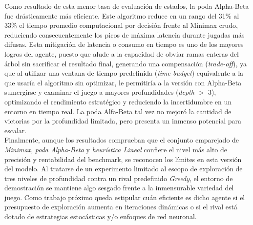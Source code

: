 \documentclass[journal,onecolumn]{IEEEtran}
\begin{document}
Como resultado de esta menor tasa de evaluación de estados, la poda Alpha-Beta fue drásticamente más eficiente. Este algoritmo reduce en un rango del 31\% al 33\% el tiempo promedio computacional por decisión frente al Minimax crudo, reduciendo consecuentemente los picos de máxima latencia durante jugadas más difusas. Esta mitigación de latencia o consumo en tiempo es uno de los mayores logros del agente, puesto que alude a la capacidad de obviar ramas enteras del árbol sin sacrificar el resultado final, generando una compensación  (\textit{trade-off}), ya que al utilizar una ventana de tiempo predefinida (\textit{time budget}) equivalente a la que usaría el algoritmo sin optimizar,  le permitiría a la versión con Alpha-Beta sumergirse y examinar el juego a mayores profundidades (\textit{depth} $>$ 3), optimizando el rendimiento estratégico y reduciendo la incertidumbre en un entorno en tiempo real. La poda Alfa-Beta tal vez no mejoró la cantidad de victorias por la profundidad limitada, pero presenta un inmenso potencial para escalar.\\

Finalmente, aunque los resultados comprueban que el conjunto emparejado de \textit{Minimax}, \textit{poda Alpha-Beta} y \textit{heurística Lineal} confiere el nivel más alto de precisión y rentabilidad del benchmark, se reconocen los límites en esta versión del modelo. Al tratarse de un experimento limitado al escopo de exploración de tres niveles de profundidad contra un rival predefinido \textit{Greedy}, el entorno de demostración se mantiene algo sesgado frente a la inmensurable variedad del juego. Como trabajo próximo queda estipular cuán eficiente es dicho agente si el presupuesto de exploración aumenta en iteraciones dinámicas o si el rival está dotado de estrategias estocásticas y/o enfoques de red neuronal.
\end{document}
